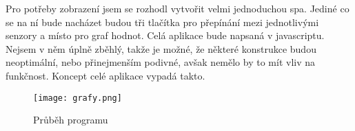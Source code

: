 Pro potřeby zobrazení jsem se rozhodl vytvořit velmi jednoduchou \gls{spa}. Jediné co se na ní bude nacházet budou tři 
tlačítka pro přepínání mezi jednotlivými senzory a místo pro graf hodnot. Celá aplikace bude napsaná v javascriptu. 
Nejsem v něm úplně zběhlý, takže je možné, že některé konstrukce budou neoptimální, nebo přinejmenším podivné, avšak 
nemělo by to mít vliv na funkčnost. Koncept celé aplikace vypadá takto.

\begin{figure}[H]
  \centering
  \texttt{[image: grafy.png]}
  \caption{Průběh programu}
\end{figure}
